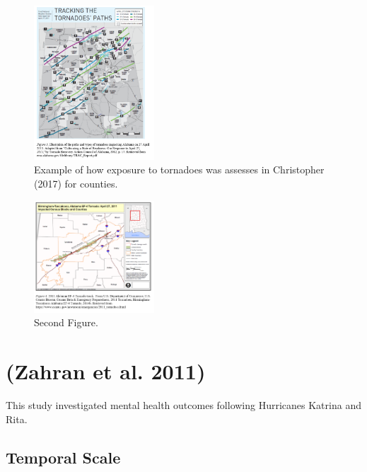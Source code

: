 \documentclass[
]{article}
\begin{document}
\begin{figure}

{\centering \includegraphics[width=0.4\textwidth]{figures/Tracking_The_Tornadoes_Paths_in_Alabama} 

}

\caption{Example of how exposure to tornadoes was assesses in Christopher (2017) for counties.}\label{fig:unnamed-chunk-3}
\end{figure}

\begin{figure}

{\centering \includegraphics[width=0.4\textwidth]{figures/Birmingham_Tuscaloosa_Tornado_Track} 

}

\caption{Second Figure.}\label{fig:unnamed-chunk-4}
\end{figure}

\hypertarget{zahran2011economics}{%
\section{(Zahran et al. 2011)}\label{zahran2011economics}}

This study investigated mental health outcomes following Hurricanes
Katrina and Rita.

\hypertarget{temporal-scale-17}{%
\subsection{Temporal Scale}\label{temporal-scale-17}}
\end{document}
